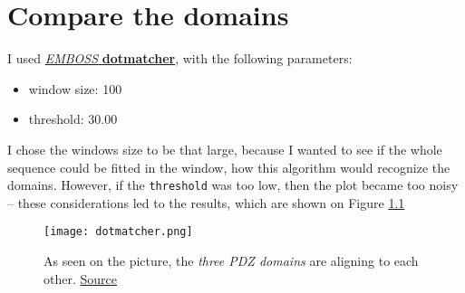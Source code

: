 \chapter{Compare the domains}

I used \href{http://www.bioinformatics.nl/cgi-bin/emboss/dotmatcher}{\emph{EMBOSS} \textbf{dotmatcher}}, with the following parameters:

\begin{itemize}
\item window size: 100
\item threshold: 30.00
\end{itemize}

I chose the windows size to be that large, because I wanted to see if the whole sequence could be fitted in the window, how this algorithm would recognize the domains. However, if the \texttt{threshold} was too low, then the plot became too noisy -- these considerations led to the results, which are shown on Figure \ref{dotplot}


\begin{figure}
\centering
\texttt{[image: dotmatcher.png]}
\caption{As seen on the picture, the \emph{three PDZ domains} are aligning to each other.
\href{http://www.bioinformatics.nl/emboss-explorer/output/146118/dotmatcher.1.png}{Source}}
\label{dotplot}
\end{figure}
